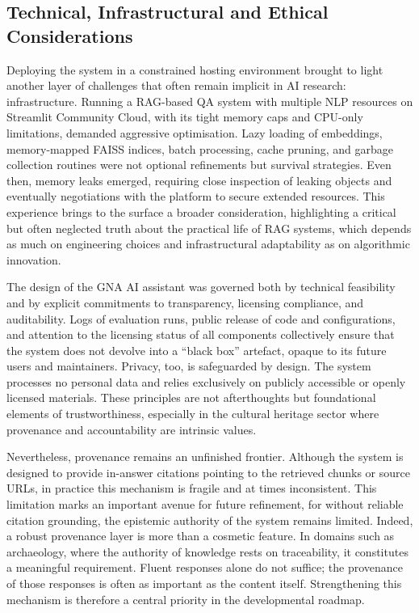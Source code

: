 \begin{spacing}{1.5}
\section{Technical, Infrastructural and Ethical Considerations}
Deploying the system in a constrained hosting environment brought to light another layer of challenges that often remain implicit in AI research: infrastructure. Running a RAG-based QA system with multiple NLP resources on Streamlit Community Cloud, with its tight memory caps and CPU-only limitations, demanded aggressive optimisation. Lazy loading of embeddings, memory-mapped FAISS indices, batch processing, cache pruning, and garbage collection routines were not optional refinements but survival strategies. Even then, memory leaks emerged, requiring close inspection of leaking objects and eventually negotiations with the platform to secure extended resources. This experience brings to the surface a broader consideration, highlighting a critical but often neglected truth about the practical life of RAG systems, which depends as much on engineering choices and infrastructural adaptability as on algorithmic innovation.

The design of the GNA AI assistant was governed both by technical feasibility and by explicit commitments to transparency, licensing compliance, and auditability. Logs of evaluation runs, public release of code and configurations, and attention to the licensing status of all components collectively ensure that the system does not devolve into a ``black box'' artefact, opaque to its future users and maintainers. Privacy, too, is safeguarded by design. The system processes no personal data and relies exclusively on publicly accessible or openly licensed materials. These principles are not afterthoughts but foundational elements of trustworthiness, especially in the cultural heritage sector where provenance and accountability are intrinsic values.

Nevertheless, provenance remains an unfinished frontier. Although the system is designed to provide in-answer citations pointing to the retrieved chunks or source URLs, in practice this mechanism is fragile and at times inconsistent. This limitation marks an important avenue for future refinement, for without reliable citation grounding, the epistemic authority of the system remains limited. Indeed, a robust provenance layer is more than a cosmetic feature. In domains such as archaeology, where the authority of knowledge rests on traceability, it constitutes a meaningful requirement. Fluent responses alone do not suffice; the provenance of those responses is often as important as the content itself. Strengthening this mechanism is therefore a central priority in the developmental roadmap.


\end{spacing}
